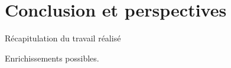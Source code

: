 \chapter*{Conclusion et perspectives}
\label{sec:conclusion}

\noindent Récapitulation du travail réalisé\\[2cm]
 	    
\vspace{0.5cm} %

\noindent Enrichissements possibles.

